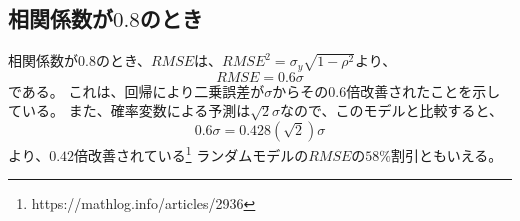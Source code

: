 \subsection{相関係数が$0.8$のとき}
相関係数が$0.8$のとき、$RMSE$は、$RMSE^2 = \sigma_y\sqrt{1-\rho^2}$より、
\begin{equation*}
 RMSE = 0.6\sigma
\end{equation*}
である。
これは、回帰により二乗誤差が$\sigma$からその$0.6$倍改善されたことを示している。
また、確率変数による予測は$\sqrt{2}\sigma$なので、このモデルと比較すると、
\begin{equation*}
 0.6\sigma = 0.428(\sqrt{2})\sigma
\end{equation*}
より、$0.42倍$改善されている\footnote{https://mathlog.info/articles/2936}
ランダムモデルの$RMSE$の$58\%$割引ともいえる。


